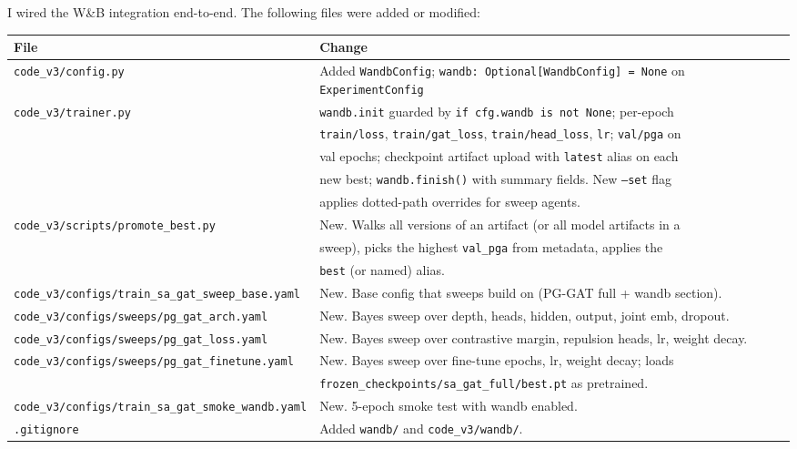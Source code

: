 I wired the W\&B integration end-to-end. The following files were added or modified:

\begin{tabular}{ll}
\hline
\textbf{File} & \textbf{Change} \\
\hline
\texttt{code\_v3/config.py} & Added \texttt{WandbConfig}; \texttt{wandb: Optional[WandbConfig] = None} on \texttt{ExperimentConfig} \\
\texttt{code\_v3/trainer.py} & \texttt{wandb.init} guarded by \texttt{if cfg.wandb is not None}; per-epoch \\
& \texttt{train/loss}, \texttt{train/gat\_loss}, \texttt{train/head\_loss}, \texttt{lr}; \texttt{val/pga} on \\
& val epochs; checkpoint artifact upload with \texttt{latest} alias on each \\
& new best; \texttt{wandb.finish()} with summary fields. New \texttt{--set} flag \\
& applies dotted-path overrides for sweep agents. \\
\texttt{code\_v3/scripts/promote\_best.py} & New. Walks all versions of an artifact (or all model artifacts in a \\
& sweep), picks the highest \texttt{val\_pga} from metadata, applies the \\
& \texttt{best} (or named) alias. \\
\texttt{code\_v3/configs/train\_sa\_gat\_sweep\_base.yaml} & New. Base config that sweeps build on (PG-GAT full + wandb section). \\
\texttt{code\_v3/configs/sweeps/pg\_gat\_arch.yaml} & New. Bayes sweep over depth, heads, hidden, output, joint emb, dropout. \\
\texttt{code\_v3/configs/sweeps/pg\_gat\_loss.yaml} & New. Bayes sweep over contrastive margin, repulsion heads, lr, weight decay. \\
\texttt{code\_v3/configs/sweeps/pg\_gat\_finetune.yaml} & New. Bayes sweep over fine-tune epochs, lr, weight decay; loads \\
& \texttt{frozen\_checkpoints/sa\_gat\_full/best.pt} as pretrained. \\
\texttt{code\_v3/configs/train\_sa\_gat\_smoke\_wandb.yaml} & New. 5-epoch smoke test with wandb enabled. \\
\texttt{.gitignore} & Added \texttt{wandb/} and \texttt{code\_v3/wandb/}. \\
\hline
\end{tabular}

\vspace{0.5em}

